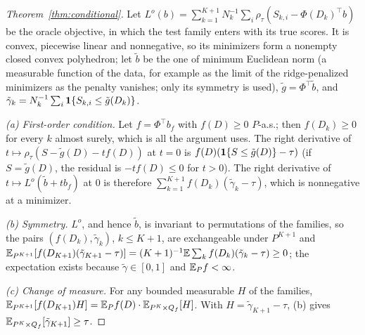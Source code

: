 \begin{proof}[Theorem~\ref{thm:conditional}]
Let $L^o(b)=\sum_{k=1}^{K+1}N_k^{-1}\sum_i\rho_\tau(S_{k,i}-\Phi(D_k)^\top b)$ be the oracle objective, in which the test family enters with its true scores. It is convex, piecewise linear and nonnegative, so its minimizers form a nonempty closed convex polyhedron; let $\tilde b$ be the one of minimum Euclidean norm (a measurable function of the data, for example as the limit of the ridge-penalized minimizers as the penalty vanishes; only its symmetry is used), $\tilde g=\Phi^\top\tilde b$, and $\tilde\gamma_k=N_k^{-1}\sum_i\mathbf{1}\{S_{k,i}\le\tilde g(D_k)\}$.

\emph{(a) First-order condition.} Let $f=\Phi^\top b_f$ with $f(D)\ge0$ $P$-a.s.; then $f(D_k)\ge0$ for every $k$ almost surely, which is all the argument uses. The right derivative of $t\mapsto\rho_\tau(S-\tilde g(D)-tf(D))$ at $t=0$ is $f(D)(\mathbf{1}\{S\le\tilde g(D)\}-\tau)$ (if $S=\tilde g(D)$, the residual is $-tf(D)\le0$ for $t>0$). The right derivative of $t\mapsto L^o(\tilde b+tb_f)$ at $0$ is therefore $\sum_{k=1}^{K+1}f(D_k)(\tilde\gamma_k-\tau)$, which is nonnegative at a minimizer.

\emph{(b) Symmetry.} $L^o$, and hence $\tilde b$, is invariant to permutations of the families, so the pairs $(f(D_k),\tilde\gamma_k)$, $k\le K+1$, are exchangeable under $P^{K+1}$ and $\mathbb{E}_{P^{K+1}}[f(D_{K+1})(\tilde\gamma_{K+1}-\tau)]=(K+1)^{-1}\mathbb{E}\sum_kf(D_k)(\tilde\gamma_k-\tau)\ge0$; the expectation exists because $\tilde\gamma\in[0,1]$ and $\mathbb{E}_Pf<\infty$.

\emph{(c) Change of measure.} For any bounded measurable $H$ of the families, $\mathbb{E}_{P^{K+1}}[f(D_{K+1})H]=\mathbb{E}_Pf(D)\cdot\mathbb{E}_{P^K\times Q_f}[H]$. With $H=\tilde\gamma_{K+1}-\tau$, (b) gives $\mathbb{E}_{P^K\times Q_f}[\tilde\gamma_{K+1}]\ge\tau$.


\end{proof}
